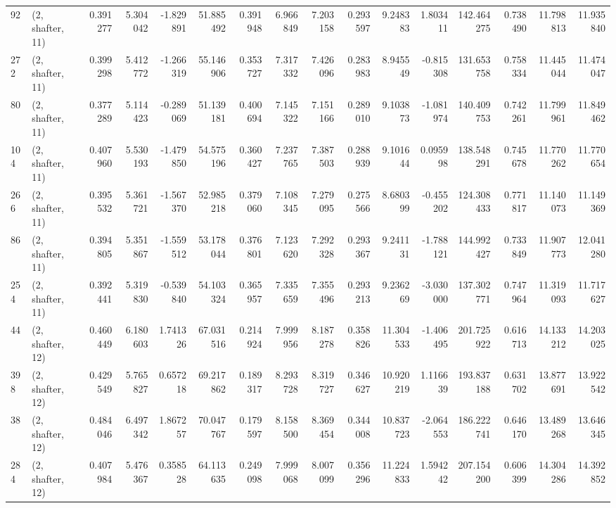 \begin{tabular}{llrrrrrrrrrrrrrr}
92  &  (2, shafter, 11) &   0.391277 &   5.304042 &  -1.829891 &    51.885492 &   0.391948 &   6.966849 &   7.203158 &  0.293597 &   9.248383 &   1.803411 &   142.464275 &   0.738490 &  11.798813 &  11.935840 \\
272 &  (2, shafter, 11) &   0.399298 &   5.412772 &  -1.266319 &    55.146906 &   0.353727 &   7.317332 &   7.426096 &  0.283983 &   8.945549 &  -0.815308 &   131.653758 &   0.758334 &  11.445044 &  11.474047 \\
80  &  (2, shafter, 11) &   0.377289 &   5.114423 &  -0.289069 &    51.139181 &   0.400694 &   7.145322 &   7.151166 &  0.289010 &   9.103873 &  -1.081974 &   140.409753 &   0.742261 &  11.799961 &  11.849462 \\
104 &  (2, shafter, 11) &   0.407960 &   5.530193 &  -1.479850 &    54.575196 &   0.360427 &   7.237765 &   7.387503 &  0.288939 &   9.101644 &   0.095998 &   138.548291 &   0.745678 &  11.770262 &  11.770654 \\
266 &  (2, shafter, 11) &   0.395532 &   5.361721 &  -1.567370 &    52.985218 &   0.379060 &   7.108345 &   7.279095 &  0.275566 &   8.680399 &  -0.455202 &   124.308433 &   0.771817 &  11.140073 &  11.149369 \\
86  &  (2, shafter, 11) &   0.394805 &   5.351867 &  -1.559512 &    53.178044 &   0.376801 &   7.123620 &   7.292328 &  0.293367 &   9.241131 &  -1.788121 &   144.992427 &   0.733849 &  11.907773 &  12.041280 \\
254 &  (2, shafter, 11) &   0.392441 &   5.319830 &  -0.539840 &    54.103324 &   0.365957 &   7.335659 &   7.355496 &  0.293213 &   9.236269 &  -3.030000 &   137.302771 &   0.747964 &  11.319093 &  11.717627 \\
44  &  (2, shafter, 12) &   0.460449 &   6.180603 &   1.741326 &    67.031516 &   0.214924 &   7.999956 &   8.187278 &  0.358826 &  11.304533 &  -1.406495 &   201.725922 &   0.616713 &  14.133212 &  14.203025 \\
398 &  (2, shafter, 12) &   0.429549 &   5.765827 &   0.657218 &    69.217862 &   0.189317 &   8.293728 &   8.319727 &  0.346627 &  10.920219 &   1.116639 &   193.837188 &   0.631702 &  13.877691 &  13.922542 \\
38  &  (2, shafter, 12) &   0.484046 &   6.497342 &   1.867257 &    70.047767 &   0.179597 &   8.158500 &   8.369454 &  0.344008 &  10.837723 &  -2.064553 &   186.222741 &   0.646170 &  13.489268 &  13.646345 \\
284 &  (2, shafter, 12) &   0.407984 &   5.476367 &   0.358528 &    64.113635 &   0.249098 &   7.999068 &   8.007099 &  0.356296 &  11.224833 &   1.594242 &   207.154200 &   0.606399 &  14.304286 &  14.392852 \\

\end{tabular}
